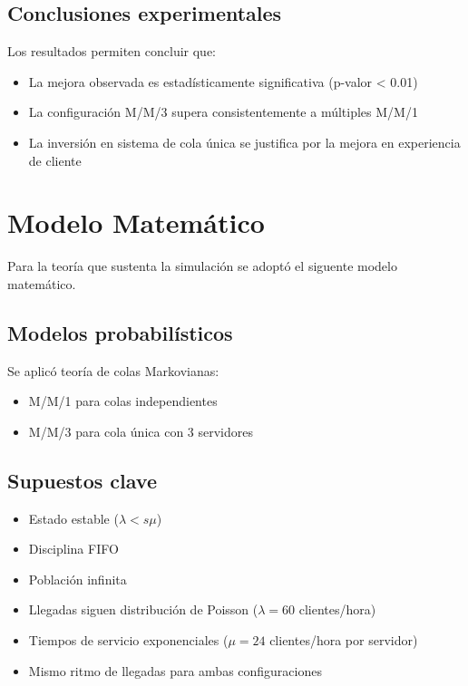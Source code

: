 \documentclass{article}
\begin{document}
\subsection{Conclusiones experimentales}
Los resultados permiten concluir que:
\begin{itemize}
\item La mejora observada es estadísticamente significativa (p-valor < 0.01)
\item La configuración M/M/3 supera consistentemente a múltiples M/M/1
\item La inversión en sistema de cola única se justifica por la mejora en experiencia de cliente
\end{itemize}

\newpage

\section{Modelo Matemático}\label{sec:modelo}

Para la teoría que sustenta la simulación se adoptó el siguente modelo matemático.

\subsection{Modelos probabilísticos}
Se aplicó teoría de colas Markovianas:
\begin{itemize}
\item M/M/1 para colas independientes
\item M/M/3 para cola única con 3 servidores
\end{itemize}

\subsection{Supuestos clave}
\begin{itemize}
\item Estado estable ($\lambda < s\mu$)
\item Disciplina FIFO
\item Población infinita
\item Llegadas siguen distribución de Poisson ($\lambda = 60$ clientes/hora)
\item Tiempos de servicio exponenciales ($\mu = 24$ clientes/hora por servidor)
\item Mismo ritmo de llegadas para ambas configuraciones
\end{itemize}
\end{document}
